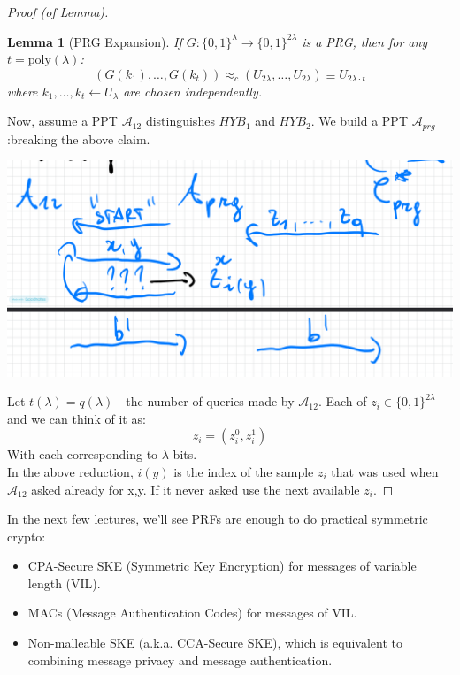 \documentclass[11pt, a4paper]{article}
\newcommand{\poly}{\text{poly}}
\newtheorem{lem}{Lemma}
\begin{document}
\begin{proof}[Proof (of Lemma)]
\begin{lem}[PRG Expansion]
If $G:\{0,1\}^{\lambda}\rightarrow\{0,1\}^{2\lambda}$ is a PRG, then for any $t = \poly(\lambda)$: 
$$ (G(k_{1}),\dots,G(k_{t})) \approx_{c} (U_{2\lambda},\dots,U_{2\lambda}) \equiv U_{2\lambda \cdot t} $$ 
where $k_{1},\dots,k_{t} \leftarrow U_{\lambda}$ are chosen independently. 
\end{lem}

Now, assume a PPT $\mathcal{A}_{12}$ distinguishes $HYB_1$ and $HYB_2$. We build a PPT $\mathcal{A}_{prg}$:breaking the above claim.
\begin{center}
    \includegraphics[scale=0.4]{img/Comp_sec/claim.png}
\end{center}
Let $t(\lambda) = q(\lambda)$ - the number of queries made by $\mathcal{A}_{12}$. Each of $z_i \in \{0,1\}^{2\lambda}$ and we can think of it as:
$$ z_i = (z_{i}^0, z_{i}^1) $$
With each corresponding to $\lambda$ bits.\\

In the above reduction, $i(y)$ is the index of the sample $z_i$ that was used when $\mathcal{A}_{12}$ asked already for x,y. If it never asked use the next available $z_i$.

\end{proof}

In the next few lectures, we'll see PRFs are enough to do practical symmetric crypto: 
\begin{itemize}
    \item CPA-Secure SKE (Symmetric Key Encryption) for messages of variable length (VIL). 
    \item MACs (Message Authentication Codes) for messages of VIL. 
    \item Non-malleable SKE (a.k.a. CCA-Secure SKE), which is equivalent to combining message privacy and message authentication. 
\end{itemize}
\end{document}
